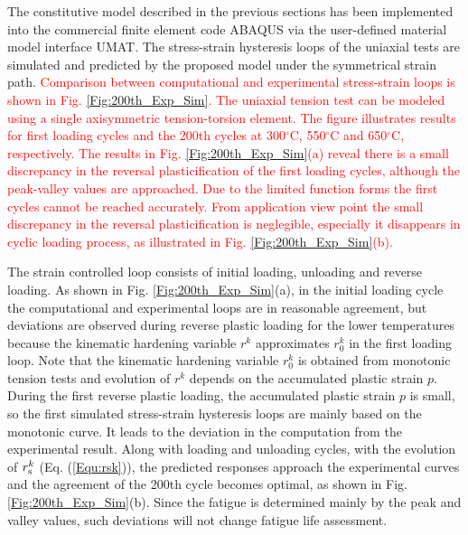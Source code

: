 \documentclass[preprint,5p,twocolumn,11pt,sort&compress]{elsarticle}
\newcommand{\marked}[1]{\textcolor{red}{#1}}
\begin{document}
\begin{figure*}
\caption{Comparison of the stress-strain hysteresis loops from experiments and computations  under isothermal uniaxial tensile loading conditions at 300$^{\circ}$C, 550$^{\circ}$C and 650$^{\circ}$C, respectively. (a) The first loading cycle. (b) The 200th. cycle.}
\label{Fig:200th_Exp_Sim}
\end{figure*}

\noindent
The constitutive model described in the previous sections has been implemented into the commercial finite element code  ABAQUS via the user-defined material model interface UMAT. 
The stress-strain hysteresis loops of the uniaxial tests are simulated and predicted by the proposed model under the symmetrical strain path.
\marked{Comparison between computational and experimental stress-strain loops is shown in Fig. \ref{Fig:200th_Exp_Sim}. The uniaxial tension test can be modeled using a single axisymmetric tension-torsion element.
The figure illustrates results for first loading cycles and the 200th cycles at 300$^{\circ}$C, 550$^{\circ}$C and 650$^{\circ}$C, respectively. The results in Fig. \ref{Fig:200th_Exp_Sim}(a) reveal there is a small discrepancy in the reversal plasticification of the first loading cycles, although the peak-valley values are approached. Due to the limited function forms the first cycles cannot be reached accurately. From application view point the small discrepancy in the reversal plasticification is neglegible, especially it disappears in cyclic loading process, as illustrated in Fig. \ref{Fig:200th_Exp_Sim}(b).}

The strain controlled loop consists of initial loading, unloading and reverse loading.
As shown in Fig. \ref{Fig:200th_Exp_Sim}(a), in the initial loading cycle the computational and experimental loops are in reasonable agreement, but deviations are observed during reverse plastic loading for the lower temperatures because the kinematic hardening variable $r^k$ approximates ${r_0^k}$ in the first loading loop.
Note that the kinematic hardening variable ${r_0^k}$ is obtained from monotonic tension tests and evolution of $r^k$ depends on the accumulated plastic strain $p$.
During the first reverse plastic loading, the accumulated plastic strain $p$ is small, so the first simulated stress-strain hysteresis loops are mainly based on the monotonic curve. It leads to the deviation in the computation from the experimental result.
Along with loading and unloading cycles, with the evolution of $r_{\rm s}^k$ (Eq. (\ref{Equ:rsk})), the predicted responses approach the experimental curves and the agreement of the 200th cycle becomes optimal, as shown in Fig. \ref{Fig:200th_Exp_Sim}(b). Since the fatigue is determined mainly by the peak and valley values, such deviations will not change fatigue life assessment.
\end{document}
